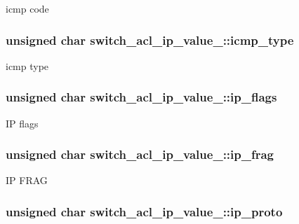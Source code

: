 icmp code \hypertarget{unionswitch__acl__ip__value___a9b8e3f43be975d5377dc8825f6a9ebaf}{
\subsubsection[{icmp\+\_\+type}]{\setlength{\rightskip}{0pt plus 5cm}unsigned char switch\+\_\+acl\+\_\+ip\+\_\+value\+\_\+\+::icmp\+\_\+type}}\label{unionswitch__acl__ip__value___a9b8e3f43be975d5377dc8825f6a9ebaf}
icmp type \hypertarget{unionswitch__acl__ip__value___a55d25ebd3582c35250ffd173fbebb0f3}{
\subsubsection[{ip\+\_\+flags}]{\setlength{\rightskip}{0pt plus 5cm}unsigned char switch\+\_\+acl\+\_\+ip\+\_\+value\+\_\+\+::ip\+\_\+flags}}\label{unionswitch__acl__ip__value___a55d25ebd3582c35250ffd173fbebb0f3}
I\+P flags \hypertarget{unionswitch__acl__ip__value___a0d15a0ce91b2fd8dd6077487bf8f20db}{
\subsubsection[{ip\+\_\+frag}]{\setlength{\rightskip}{0pt plus 5cm}unsigned char switch\+\_\+acl\+\_\+ip\+\_\+value\+\_\+\+::ip\+\_\+frag}}\label{unionswitch__acl__ip__value___a0d15a0ce91b2fd8dd6077487bf8f20db}
I\+P F\+R\+A\+G \hypertarget{unionswitch__acl__ip__value___ae162f1414874cd03f57b722ca1acb8e9}{
\subsubsection[{ip\+\_\+proto}]{\setlength{\rightskip}{0pt plus 5cm}unsigned char switch\+\_\+acl\+\_\+ip\+\_\+value\+\_\+\+::ip\+\_\+proto}}\label{unionswitch__acl__ip__value___ae162f1414874cd03f57b722ca1acb8e9}
